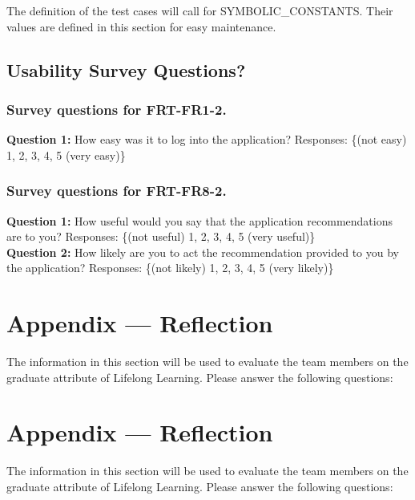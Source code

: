 \documentclass[12pt, titlepage]{article}
\begin{document}
The definition of the test cases will call for SYMBOLIC\_CONSTANTS.
Their values are defined in this section for easy maintenance.

\subsection{Usability Survey Questions?}


\subsubsection{Survey questions for \textbf{FRT-FR1-2}.}

\noindent \textbf{Question 1:} How easy was it to log into the application?
Responses: \{(not easy) 1, 2, 3, 4, 5 (very easy)\} \\

\subsubsection{Survey questions for \textbf{FRT-FR8-2}.}

\noindent \textbf{Question 1:} How useful would you say that the application recommendations are to you?
Responses: \{(not useful) 1, 2, 3, 4, 5 (very useful)\} \\

\noindent \textbf{Question 2:} How likely are you to act the recommendation provided to you by the application?
Responses: \{(not likely) 1, 2, 3, 4, 5 (very likely)\}

\newpage{}
\section*{Appendix --- Reflection}

The information in this section will be used to evaluate the team members on the
graduate attribute of Lifelong Learning.  Please answer the following questions:

\newpage{}
\section*{Appendix --- Reflection}


The information in this section will be used to evaluate the team members on the
graduate attribute of Lifelong Learning.  Please answer the following questions:
\end{document}
